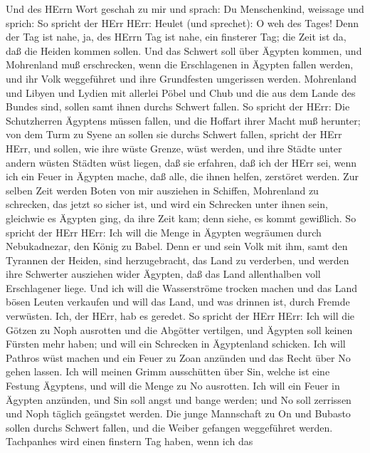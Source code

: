  Und des HErrn Wort geschah zu mir und sprach: 
Du Menschenkind, weissage und sprich: So spricht der HErr HErr: Heulet
(und sprechet): O weh des Tages!  Denn der Tag ist nahe, ja,
des HErrn Tag ist nahe, ein finsterer Tag; die Zeit ist da, daß die
Heiden kommen sollen.  Und das Schwert soll über Ägypten
kommen, und Mohrenland muß erschrecken, wenn die Erschlagenen in Ägypten
fallen werden, und ihr Volk weggeführet und ihre Grundfesten umgerissen
werden.  Mohrenland und Libyen und Lydien mit allerlei Pöbel
und Chub und die aus dem Lande des Bundes sind, sollen samt ihnen durchs
Schwert fallen.  So spricht der HErr: Die Schutzherren
Ägyptens müssen fallen, und die Hoffart ihrer Macht muß herunter; von
dem Turm zu Syene an sollen sie durchs Schwert fallen, spricht der HErr
HErr,  und sollen, wie ihre wüste Grenze, wüst werden, und
ihre Städte unter andern wüsten Städten wüst liegen,  daß
sie erfahren, daß ich der HErr sei, wenn ich ein Feuer in Ägypten mache,
daß alle, die ihnen helfen, zerstöret werden.  Zur selben
Zeit werden Boten von mir ausziehen in Schiffen, Mohrenland zu
schrecken, das jetzt so sicher ist, und wird ein Schrecken unter ihnen
sein, gleichwie es Ägypten ging, da ihre Zeit kam; denn siehe, es kommt
gewißlich.  So spricht der HErr HErr: Ich will die Menge in
Ägypten wegräumen durch Nebukadnezar, den König zu Babel. 
Denn er und sein Volk mit ihm, samt den Tyrannen der Heiden, sind
herzugebracht, das Land zu verderben, und werden ihre Schwerter
ausziehen wider Ägypten, daß das Land allenthalben voll Erschlagener
liege.  Und ich will die Wasserströme trocken machen und
das Land bösen Leuten verkaufen und will das Land, und was drinnen ist,
durch Fremde verwüsten. Ich, der HErr, hab es geredet.  So
spricht der HErr HErr: Ich will die Götzen zu Noph ausrotten und die
Abgötter vertilgen, und Ägypten soll keinen Fürsten mehr haben; und will
ein Schrecken in Ägyptenland schicken.  Ich will Pathros
wüst machen und ein Feuer zu Zoan anzünden und das Recht über No gehen
lassen.  Ich will meinen Grimm ausschütten über Sin, welche
ist eine Festung Ägyptens, und will die Menge zu No ausrotten.
 Ich will ein Feuer in Ägypten anzünden, und Sin soll angst
und bange werden; und No soll zerrissen und Noph täglich geängstet
werden.  Die junge Mannschaft zu On und Bubasto sollen
durchs Schwert fallen, und die Weiber gefangen weggeführet werden.
 Tachpanhes wird einen finstern Tag haben, wenn ich das
